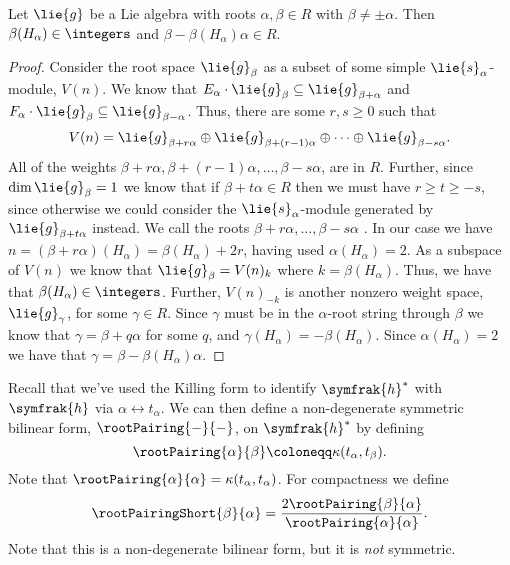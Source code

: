 \documentclass[fleqn]{NotesClass}
\newcommand{\csa}{\symfrak{h}}
\begin{document}
    \begin{lma}{}{}
        Let \(\lie{g}\) be a Lie algebra with roots \(\alpha, \beta \in R\) with \(\beta \ne \pm \alpha\).
        Then \(\beta(H_\alpha) \in \integers\) and \(\beta - \beta(H_\alpha) \alpha \in R\).
        \begin{proof}
            Consider the root space \(\lie{g}_\beta\) as a subset of some simple \(\lie{s}_\alpha\)-module, \(V(n)\).
            We know that \(E_\alpha \cdot \lie{g}_\beta \subseteq \lie{g}_{\beta + \alpha}\) and \(F_\alpha \cdot \lie{g}_\beta \subseteq \lie{g}_{\beta - \alpha}\).
            Thus, there are some \(r, s \ge 0\) such that
            \begin{equation}
                V(n) = \lie{g}_{\beta + r\alpha} \oplus \lie{g}_{\beta + (r - 1)\alpha} \oplus \dotsb \oplus \lie{g}_{\beta - s\alpha}.
            \end{equation}
            All of the weights \(\beta + r\alpha, \beta + (r - 1)\alpha, \dotsc, \beta - s\alpha\), are in \(R\).
            Further, since \(\dim \lie{g}_\beta = 1\) we know that if \(\beta + t\alpha \in R\) then we must have \(r \ge t \ge -s\), since otherwise we could consider the \(\lie{s}_\alpha\)-module generated by \(\lie{g}_{\beta + t\alpha}\) instead.
            We call the roots \(\beta + r\alpha, \dotsc, \beta - s\alpha\) .
            In our case we have \(n = (\beta + r\alpha)(H_\alpha) = \beta(H_\alpha) + 2r\), having used \(\alpha(H_\alpha) = 2\).
            As a subspace of \(V(n)\) we know that \(\lie{g}_\beta = V(n)_k\) where \(k = \beta(H_\alpha)\).
            Thus, we have that \(\beta(H_\alpha) \in \integers\).
            Further, \(V(n)_{-k}\) is another nonzero weight space, \(\lie{g}_\gamma\), for some \(\gamma \in R\).
            Since \(\gamma\) must be in the \(\alpha\)-root string through \(\beta\) we know that \(\gamma = \beta + q\alpha\) for some \(q\), and \(\gamma(H_\alpha) = -\beta(H_\alpha)\).
            Since \(\alpha(H_\alpha) = 2\) we have that \(\gamma = \beta - \beta(H_\alpha)\alpha\).
        \end{proof}
    \end{lma}
    
    Recall that we've used the Killing form to identify \(\csa^*\) with \(\csa\) via \(\alpha \leftrightarrow t_\alpha\).
    We can then define a non-degenerate symmetric bilinear form, \(\rootPairing{-}{-}\), on \(\csa^*\) by defining
    \begin{equation}
        \rootPairing{\alpha}{\beta} \coloneqq \kappa(t_\alpha, t_\beta).
    \end{equation}
    Note that \(\rootPairing{\alpha}{\alpha} = \kappa(t_\alpha, t_\alpha)\).
    For compactness we define
    \begin{equation}
        \rootPairingShort{\beta}{\alpha} = \frac{2\rootPairing{\beta}{\alpha}}{\rootPairing{\alpha}{\alpha}}.
    \end{equation}
    Note that this is a non-degenerate bilinear form, but it is \emph{not} symmetric.
    
\end{document}
